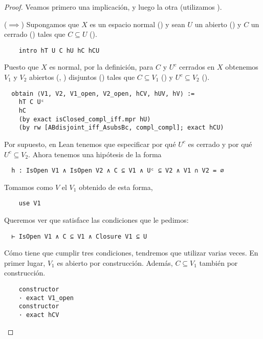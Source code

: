 \begin{proof}
  Veamos primero una implicación, y luego la otra (utilizamos ).

  ($\implies$) Supongamos que $X$ es un espacio normal () y sean $U$ un abierto () y $C$ un cerrado () tales que $C \subseteq U$ ().

\begin{lstlisting}
    intro hT U C hU hC hCU
\end{lstlisting}
  
  Puesto que $X$ es normal, por la definición, para $C$ y $U^c$ cerrados en $X$ obtenemos $V_1$ y $V_2$ abiertos (, ) disjuntos () tales que $C \subseteq V_1$ () y $U^c \subseteq V_2$ ().

\begin{lstlisting}
  obtain ⟨V1, V2, V1_open, V2_open, hCV, hUV, hV⟩ :=
    hT C Uᶜ
    hC
    (by exact isClosed_compl_iff.mpr hU)
    (by rw [ABdisjoint_iff_AsubsBc, compl_compl]; exact hCU)
\end{lstlisting}

  Por supuesto, en Lean tenemos que especificar por qué $U^c$ es cerrado y por qué $U^c \subseteq V_2$. Ahora tenemos una hipótesis de la forma

\begin{lstlisting}
  h : IsOpen V1 ∧ IsOpen V2 ∧ C ⊆ V1 ∧ Uᶜ ⊆ V2 ∧ V1 ∩ V2 = ∅
\end{lstlisting}
  
  Tomamos como $V$ el $V_1$ obtenido de esta forma,

\begin{lstlisting}
    use V1
\end{lstlisting}

  Queremos ver que satisface las condiciones que le pedimos:

\begin{lstlisting}
  ⊢ IsOpen V1 ∧ C ⊆ V1 ∧ Closure V1 ⊆ U
\end{lstlisting}
  
  Cómo tiene que cumplir tres condiciones, tendremos que utilizar  varias veces. En primer lugar, $V_1$ es abierto por construcción. Además, $C \subseteq V_1$ también por construcción.

\begin{lstlisting}
    constructor
    · exact V1_open
    constructor
    · exact hCV
\end{lstlisting}


\end{proof}
